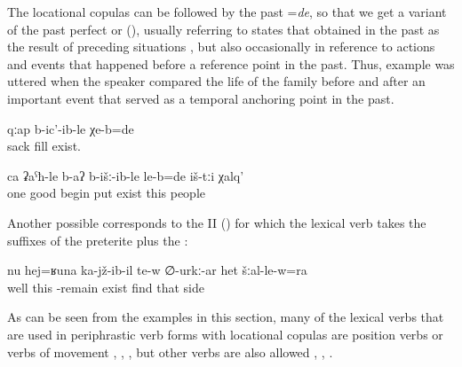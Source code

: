 The locational copulas can be followed by the past  =\textit{de}, so that we get a variant of the past perfect or  (), usually referring to states that obtained in the past as the result of preceding situations , but also occasionally in reference to actions and events that happened before a reference point in the past. Thus, example  was uttered when the speaker compared the life of the family before and after an important event that served as a temporal anchoring point in the past.

\begin{exe}
	\ex	\label{ex:The sack was full filled}
	\gll	qːap	b-ic'-ib-le	χe-b=de\\
		sack	fill	exist.\\
	\glt	{}

	\ex	\label{ex:The people started well}
	\gll	ca	ʡaˁħ-le	b-aʔ	b-išː-ib-le	le-b=de	iš-tːi	χalq'\\
		one	good	begin	put	exist	this	people\\
	\glt	{}
\end{exe}

Another possible  corresponds to the  II () for which the lexical verb takes the suffixes of the preterite plus the  :

\begin{exe}
	\ex	\label{ex:‎Well, he is like sitting, probably, at the side (of the road)}
	\gll	nu	hej=ʁuna	ka-jž-ib-il	te-w	∅-urkː-ar	het	šːal-le-w=ra\\
		well	this	-remain	exist	find	that	side\\
	\glt	{}
\end{exe}

As can be seen from the examples in this section, many of the lexical verbs that are used in periphrastic verb forms with locational copulas are position verbs or verbs of movement , , , but other verbs are also allowed , , .

